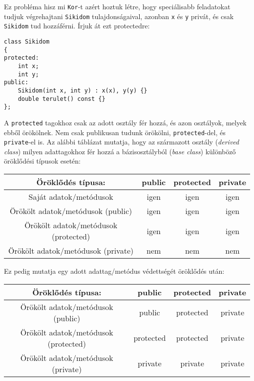 \documentclass[a4paper,11.5pt,table]{article}
\begin{document}
	Ez probléma hisz mi \texttt{Kor}-t azért hoztuk létre, hogy speciálisabb feladatokat tudjuk végrehajtani \texttt{Sikidom} tulajdonságaival, azonban \texttt{x} és \texttt{y} privát, és csak \texttt{Sikidom} tud hozzáférni. Írjuk át ezt protectedre:
\begin{lstlisting}
class Sikidom
{
protected:
	int x;
	int y;
public:
	Sikidom(int x, int y) : x(x), y(y) {}
	double terulet() const {}
};
\end{lstlisting}
	A \texttt{protected} tagokhoz csak az adott osztály fér hozzá, és azon osztályok, melyek ebből örökölnek. Nem csak publikusan tudunk örökölni, \texttt{protected}-del, és \texttt{private}-el is. Az alábbi táblázat mutatja, hogy az származott osztály (\textit{derived class}) milyen adattagokhoz fér hozzá a bázisosztályból (\textit{base class}) különböző öröklődési típusok esetén:
	\begin{center}
		\begin{tabular}{|c||c|c|c|}
			\hline
			Öröklődés típusa:&public&protected&private\\
			\hline
			\hline
			Saját adatok/metódusok& \cellcolor{green!20}igen&\cellcolor{green!20}igen&\cellcolor{green!20}igen\\
			\hline
			Örökölt adatok/metódusok (public)&\cellcolor{green!20}igen&\cellcolor{green!20}igen&\cellcolor{green!20}igen\\
			\hline
			Örökölt adatok/metódusok (protected)&\cellcolor{green!20}igen&\cellcolor{green!20}igen&\cellcolor{green!20}igen\\
			\hline
			Örökölt adatok/metódusok (private)&\cellcolor{red!20}nem&\cellcolor{red!20}nem&\cellcolor{red!20}nem\\
			\hline
		\end{tabular}
	\end{center}
	Ez pedig mutatja egy adott adattag/metódus védettségét öröklődés után:
	\begin{center}
		\begin{tabular}{|c||c|c|c|}
			\hline
			Öröklődés típusa:&public&protected&private\\
			\hline
			\hline
			Örökölt adatok/metódusok (public)&\cellcolor{green!20}public&\cellcolor{orange!20}protected&\cellcolor{red!20}private\\
			\hline
			Örökölt adatok/metódusok (protected)&\cellcolor{orange!20}protected&\cellcolor{orange!20}protected&\cellcolor{red!20}private\\
			\hline
			Örökölt adatok/metódusok (private)&\cellcolor{red!20}private&\cellcolor{red!20}private&\cellcolor{red!20}private\\
			\hline
		\end{tabular}
	\end{center}
\end{document}

